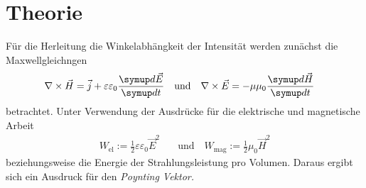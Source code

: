 \section{Theorie}
\label{sec:Theorie}

Für die Herleitung die Winkelabhängkeit der Intensität werden zunächst die Maxwellgleichngen
\begin{align}
    \nabla \times \vec{H}=\vec{j}+\varepsilon \varepsilon_{0} \frac{ \dif{\vec{E}}}{ \dif{t}} 
    \quad & \text{und} \quad 
    \nabla \times \vec{E}=-\mu \mu_{0} \frac{\dif{\vec{H}}}{\dif{t}} 
\end{align}
betrachtet. Unter Verwendung der Ausdrücke für die elektrische und magnetische Arbeit
\begin{align}
    W_{\text{el}}   :=  \frac{1}{2} \varepsilon \varepsilon_{0} \vec{E}^{2} 
    \quad & \text{und} \quad 
    W_{\text{mag}}  :=  \frac{1}{2} \mu_{0} \vec{H}^{2}
\end{align}
beziehungsweise die Energie der Strahlungsleistung pro Volumen. 
Daraus ergibt sich ein Ausdruck für den \textit{Poynting Vektor.} 

